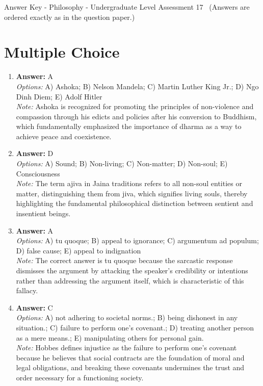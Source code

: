 \documentclass[12pt]{article}
\begin{document}
\begin{center}
Answer Key - Philosophy - Undergraduate Level Assessment 17 \
\small (Answers are ordered exactly as in the question paper.)
\end{center}

\section*{Multiple Choice}
\begin{enumerate}[label=\arabic*.]
\item \textbf{Answer:} A
\\ \textit{Options:} A) Ashoka; B) Nelson Mandela; C) Martin Luther King Jr.; D) Ngo Dinh Diem; E) Adolf Hitler
\\ \textit{Note:} Ashoka is recognized for promoting the principles of non-violence and compassion through his edicts and policies after his conversion to Buddhism, which fundamentally emphasized the importance of dharma as a way to achieve peace and coexistence.
\item \textbf{Answer:} D
\\ \textit{Options:} A) Sound; B) Non-living; C) Non-matter; D) Non-soul; E) Consciousness
\\ \textit{Note:} The term ajiva in Jaina traditions refers to all non-soul entities or matter, distinguishing them from jiva, which signifies living souls, thereby highlighting the fundamental philosophical distinction between sentient and insentient beings.
\item \textbf{Answer:} A
\\ \textit{Options:} A) tu quoque; B) appeal to ignorance; C) argumentum ad populum; D) false cause; E) appeal to indignation
\\ \textit{Note:} The correct answer is tu quoque because the sarcastic response dismisses the argument by attacking the speaker's credibility or intentions rather than addressing the argument itself, which is characteristic of this fallacy.
\item \textbf{Answer:} C
\\ \textit{Options:} A) not adhering to societal norms.; B) being dishonest in any situation.; C) failure to perform one's covenant.; D) treating another person as a mere means.; E) manipulating others for personal gain.
\\ \textit{Note:} Hobbes defines injustice as the failure to perform one's covenant because he believes that social contracts are the foundation of moral and legal obligations, and breaking these covenants undermines the trust and order necessary for a functioning society.

\end{enumerate}
\end{document}
